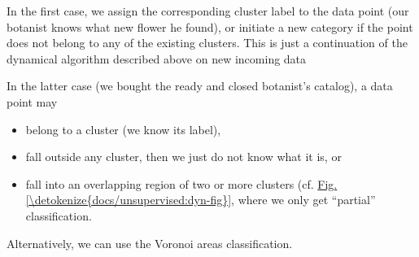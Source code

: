 \documentclass[letterpaper,10pt,english]{jupyterBook}
\begin{document}
\sphinxAtStartPar
In the first case, we assign the corresponding cluster label to the data point (our botanist knows what new flower he found), or initiate a new category if the point does not belong to any of the existing clusters. This is just a continuation of the dynamical algorithm described above on new incoming data

\sphinxAtStartPar
In the latter case (we bought the ready and closed botanist’s catalog), a data point may
\begin{itemize}
\item {} 
\sphinxAtStartPar
belong to a cluster (we know its label),

\item {} 
\sphinxAtStartPar
fall outside any cluster, then we just do not know what it is, or

\item {} 
\sphinxAtStartPar
fall into an overlapping region of two or more clusters (cf. \hyperref[\detokenize{docs/unsupervised:dyn-fig}]{Fig.\@ \ref{\detokenize{docs/unsupervised:dyn-fig}}}, where we only get “partial” classification.

\end{itemize}

\sphinxAtStartPar
Alternatively, we can use the Voronoi areas classification.
\end{document}
